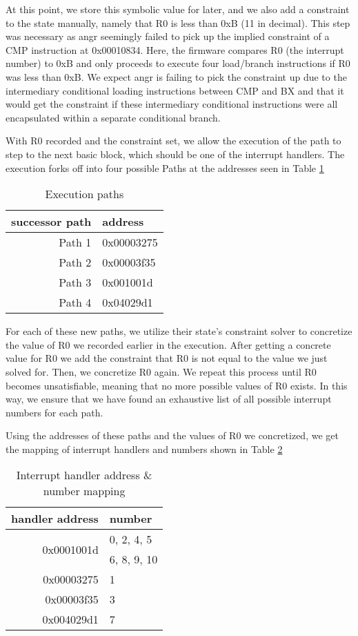\documentclass[letterpaper, 11 pt, conference]{ieeeconf}
\begin{document}
At this point, we store this symbolic value for later, and we also add a constraint to the state manually, namely that R0 is less than 0xB (11 in decimal). This step was necessary as angr seemingly failed to pick up the implied constraint of a CMP instruction at 0x00010834. Here, the firmware compares R0 (the interrupt number) to 0xB and only proceeds to execute four load/branch instructions if R0 was less than 0xB. We expect angr is failing to pick the constraint up due to the intermediary conditional loading instructions between CMP and BX and that it would get the constraint if these intermediary conditional instructions were all encapsulated within a separate conditional branch.

With R0 recorded and the constraint set, we allow the execution of the path to step to the next basic block, which should be one of the interrupt handlers. The execution forks off into four possible Paths at the addresses seen in Table \ref{table:paths}

\begin{table}[h]
\centering
\begin{tabular}{r|l}
successor path & address \\ \hline
Path 1 & 0x00003275 \\
Path 2 & 0x00003f35 \\
Path 3 & 0x001001d \\
Path 4 & 0x04029d1 \\
\end{tabular}
\caption{Execution paths}
\label{table:paths}
\end{table}

For each of these new paths, we utilize their state’s constraint solver to concretize the value of R0 we recorded earlier in the execution. After getting a concrete value for R0 we add the constraint that R0 is not equal to the value we just solved for. Then, we concretize R0 again. We repeat this process until R0 becomes unsatisfiable, meaning that no more possible values of R0 exists. In this way, we ensure that we have found an exhaustive list of all possible interrupt numbers for each path. 

Using the addresses of these paths and the values of R0 we concretized, we get the mapping of interrupt handlers and numbers shown in Table \ref{table:results}

\begin{table}[h]
\centering
\begin{tabular}{r|l}
handler address & number \\ \hline
\multirow{2}{*}{0x0001001d} & 0, 2, 4, 5 \\ & 6, 8, 9, 10 \\
0x00003275 & 1 \\
0x00003f35& 3 \\
0x004029d1 & 7 \\
\end{tabular}
\caption{Interrupt handler address \& number mapping}
\label{table:results}
\end{table}
\end{document}
